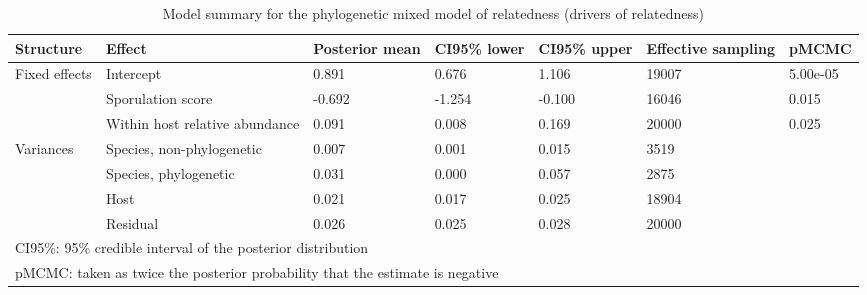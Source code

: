 \begin{table}

\caption{\label{tab:}Model summary for the phylogenetic mixed model of relatedness (drivers of relatedness)}
\centering
\begin{tabular}[t]{lllllll}
\toprule
Structure & Effect & Posterior
 mean & CI95\% lower & CI95\% upper & Effective
 sampling & pMCMC\\
\midrule
Fixed effects & Intercept & 0.891 & 0.676 & 1.106 & 19007 & 5.00e-05\\
 & Sporulation score & -0.692 & -1.254 & -0.100 & 16046 & 0.015\\
 & Within host relative abundance & 0.091 & 0.008 & 0.169 & 20000 & 0.025\\
Variances & Species, non-phylogenetic & 0.007 & 0.001 & 0.015 & 3519 & \\
 & Species, phylogenetic & 0.031 & 0.000 & 0.057 & 2875 & \\
 & Host & 0.021 & 0.017 & 0.025 & 18904 & \\
 & Residual & 0.026 & 0.025 & 0.028 & 20000 & \\
\bottomrule
\multicolumn{7}{l}{\rule{0pt}{1em}CI95\%: 95\% credible interval of the posterior distribution}\\
\multicolumn{7}{l}{\rule{0pt}{1em}pMCMC: taken as twice the posterior probability that the estimate is negative}\\
\end{tabular}
\end{table}
